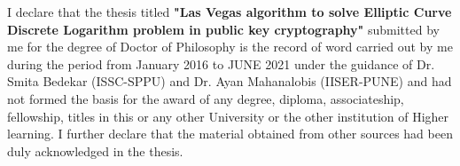 I declare that the thesis titled \textbf{"Las Vegas algorithm to solve Elliptic Curve Discrete Logarithm problem in public key cryptography"} submitted by me for the degree of Doctor of Philosophy is the record of word carried out by me during the period from January 2016 to JUNE 2021 under the guidance of Dr. Smita Bedekar (ISSC-SPPU) and Dr. Ayan Mahanalobis (IISER-PUNE) and had not formed the basis for the award of any degree, diploma, associateship, fellowship, titles in this or any other University or the other institution of Higher learning. I further declare that the material obtained from other sources had been duly acknowledged in the thesis.
